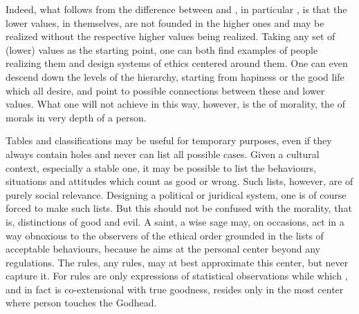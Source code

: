 {{Indeed, what follows from the difference between  and
, in particular , is that the lower
values, in themselves, are not founded in the higher ones and may be realized
without the respective higher values being realized. Taking any set of (lower)
values as the starting point, one can both find examples of people realizing
them and design systems of ethics centered around them. One can even descend
down the levels of the hierarchy, starting from hapiness or the good life which
all desire, and point to possible connections between these and lower values.
What one will not achieve in this way, however, is the  of
morality, the  of morals in very depth of a person.

\pa Tables and classifications may be useful for temporary purposes,
even if they always contain holes and never can list all possible
cases.  Given a cultural context, especially a stable one, it may be
possible to list the behaviours, situations and attitudes which count
as good or wrong.  Such lists, however, are of purely social
relevance.  Designing a political or juridical system, one is of
course forced to make such lists.  But this should not be confused
with the  morality, that is, 
distinctions of good and evil.  A saint, a wise sage may, on
occasions, act in a way obnoxious to the observers of the ethical
order grounded in the lists of acceptable behaviours, because he aims
at the personal center beyond any regulations.  The rules, any rules,
may at best approximate this center, but never capture it.  For rules
are only expressions of statistical observations while 
which , and in fact is co-extensional with true goodness,
resides only in the most  center where person touches the
 Godhead.

}}
